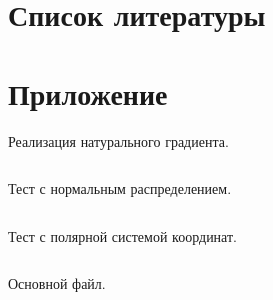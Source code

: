 \documentclass[a4paper,12pt]{article}
\begin{document}
\section{Список литературы}
\nocite{*}
\printbibliography[heading=none]
\newpage

\section{Приложение}

Реализация натурального градиента.
%
\inputminted[breaklines=true]{python}{code/natgrad.py}
\newpage
Тест с нормальным распределением.
%
\inputminted[breaklines=true]{python}{code/likelihood_test.py}
\newpage
Тест с полярной системой координат.
%
\inputminted[breaklines=true]{python}{code/polar_test.py}
\newpage
Основной файл.
%
\inputminted[breaklines=true]{python}{code/main.py}
\newpage
\end{document}
